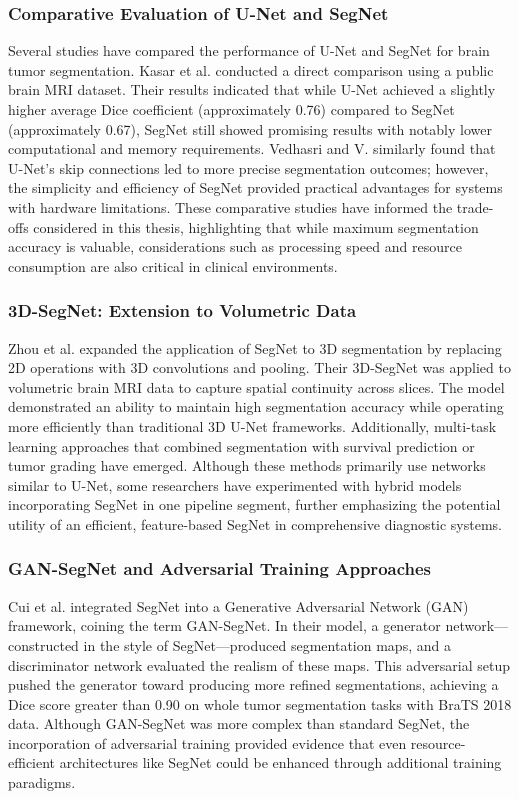 \subsubsection{Comparative Evaluation of U-Net and SegNet}
\label{sec:comparative_eval}
Several studies have compared the performance of U-Net and SegNet for brain tumor segmentation. Kasar et al. \cite{kasar2024comparative} conducted a direct comparison using a public brain MRI dataset. Their results indicated that while U-Net achieved a slightly higher average Dice coefficient (approximately 0.76) compared to SegNet (approximately 0.67), SegNet still showed promising results with notably lower computational and memory requirements. Vedhasri and V. \cite{vedhasri2024segmentation} similarly found that U-Net's skip connections led to more precise segmentation outcomes; however, the simplicity and efficiency of SegNet provided practical advantages for systems with hardware limitations. These comparative studies have informed the trade-offs considered in this thesis, highlighting that while maximum segmentation accuracy is valuable, considerations such as processing speed and resource consumption are also critical in clinical environments.

\subsubsection{3D-SegNet: Extension to Volumetric Data}
\label{sec:3d_segnet}
Zhou et al. \cite{zhou20193dsegnet} expanded the application of SegNet to 3D segmentation by replacing 2D operations with 3D convolutions and pooling. Their 3D-SegNet was applied to volumetric brain MRI data to capture spatial continuity across slices. The model demonstrated an ability to maintain high segmentation accuracy while operating more efficiently than traditional 3D U-Net frameworks. Additionally, multi-task learning approaches that combined segmentation with survival prediction or tumor grading have emerged. Although these methods primarily use networks similar to U-Net, some researchers have experimented with hybrid models incorporating SegNet in one pipeline segment, further emphasizing the potential utility of an efficient, feature-based SegNet in comprehensive diagnostic systems.

\subsubsection{GAN-SegNet and Adversarial Training Approaches}
\label{sec:gan_segnet}
Cui et al. \cite{cui2021gansegnet} integrated SegNet into a Generative Adversarial Network (GAN) framework, coining the term GAN-SegNet. In their model, a generator network—constructed in the style of SegNet—produced segmentation maps, and a discriminator network evaluated the realism of these maps. This adversarial setup pushed the generator toward producing more refined segmentations, achieving a Dice score greater than 0.90 on whole tumor segmentation tasks with BraTS 2018 data. Although GAN-SegNet was more complex than standard SegNet, the incorporation of adversarial training provided evidence that even resource-efficient architectures like SegNet could be enhanced through additional training paradigms.

